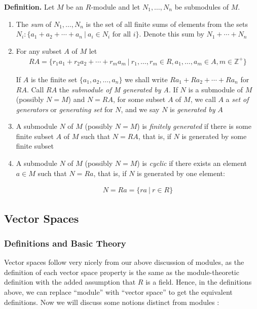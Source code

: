\documentclass[11pt, reqno]{amsart}
\theoremstyle{plain}
\theoremstyle{definition}
\theoremstyle{example}
\begin{document}
\par
\textbf{Definition.} Let $M$ be an $R$-module and let $N_1, \ldots, N_n$ be submodules of $M$.
\begin{enumerate}
\item The \textit{sum} of $N_1, \ldots, N_n$ is the set of all finite sums of elements from the sets $N_i: \{a_1 + a_2 + \cdots + a_n \  | \ a_i \in N_i \text{ for all } i\}$. Denote this sum by $N_1 + \cdots + N_n$
\item For any subset $A$ of $M$ let
\begin{align*}
RA = \{r_1 a_1 + r_2a_2 + \cdots + r_ma_m \ | \ r_1, \ldots, r_m \in R, a_1, \ldots, a_m \in A, m \in \mathbb{Z}^+\}
\end{align*}

If $A$ is the finite set $\{a_1, a_2, \ldots, a_n\}$ we shall write $Ra_1 + Ra_2 + \cdots + Ra_n$ for $RA$. Call $RA$ the \textit{submodule of M generated by A}. If $N$ is a submodule of $M$ (possibly $N = M$) and $N = RA$, for some subset $A$ of $M$, we call $A$ a \textit{set of generators} or \textit{generating set} for $N$, and we say $N$ is \textit{generated by} $A$

\item A submodule $N$ of $M$ (possibly $N = M$) is \textit{finitely generated} if there is some finite subset $A$ of $M$ such that $N = RA$, that is, if $N$ is generated by some finite subset

\item A submodule $N$ of $M$ (possibly $N = M$) is \textit{cyclic} if there exists an element $a \in M$ such that $N = Ra$, that is, if $N$ is generated by one element:

\begin{align*}
N = Ra = \{ra \ | \ r \in R\}
\end{align*}
\end{enumerate} 



\subsection{Vector Spaces}


\subsubsection{Definitions and Basic Theory}

Vector spaces follow very nicely from our above discussion of modules, as the definition of each vector space property is the same as the module-theoretic definition with the added assumption that $R$ is a field. Hence, in the definitions above, we can replace ``module'' with ``vector space'' to get the equivalent definitions. Now we will discuss some notions distinct from modules \cite[\S 11.1, p. 409]{dummit}:
\end{document}
